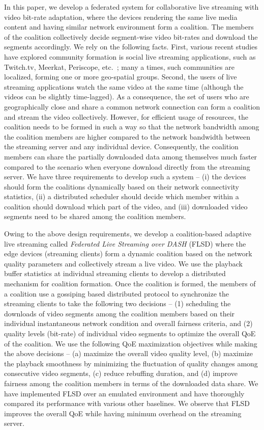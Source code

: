 In this paper, we develop a federated system for collaborative live streaming with video bit-rate adaptation, where the devices rendering the same live media content and having similar network environment form a coalition. The members of the coalition collectively decide segment-wise video bit-rates and download the segments accordingly. We rely on the following facts. First, various recent studies have explored community formation is social live streaming applications, such as Twitch.tv, Meerkat, Periscope, etc.~\cite{dougherty2011live}; many a times, such communities are localized, forming one or more geo-spatial groups. Second, the users of live streaming applications watch the same video at the same time (although the videos can be slightly time-lagged). As a consequence, the set of users who are geographically close and share a common network connection can form a coalition and stream the video collectively. However, for efficient usage of resources, the coalition needs to be formed in such a way so that the network bandwidth among the coalition members are higher compared to the network bandwidth between the streaming server and any individual device. Consequently, the coalition members can share the partially downloaded data among themselves much faster compared to the scenario when everyone download directly from the streaming server. We have three requirements to develop such a system -- (i) the devices should form the coalitions dynamically based on their network connectivity statistics, (ii) a distributed scheduler should decide which member within a coalition should download which part of the video, and (iii) downloaded video segments need to be shared among the coalition members. 

Owing to the above design requirements, we develop a coalition-based adaptive live streaming  called \textit{Federated Live Streaming over DASH} (FLSD) where the edge devices (streaming clients) form a dynamic coalition based on the network quality parameters and collectively stream a live video. We use the playback buffer statistics at individual streaming clients to develop a distributed mechanism for coalition formation. Once the coalition is formed, the members of a coalition use a gossiping based distributed protocol to synchronize the streaming clients to take the following two decisions -- (1) scheduling the downloads of video segments among the coalition members based on their individual instantaneous network condition and overall fairness criteria, and (2) quality levels (bit-rate) of individual video segments to optimize the overall QoE of the coalition. We use the following QoE maximization objectives while making the above decisions -- (a) maximize the overall video quality level, (b) maximize the playback smoothness by minimizing the fluctuation of quality changes among consecutive video segments, (c) reduce rebuffing duration, and (d) improve fairness  among the coalition members in terms of the downloaded data share. We have implemented FLSD over an emulated environment and have thoroughly compared its performance with various other baselines. We observe that FLSD improves the overall QoE while having minimum overhead on the streaming server. 


